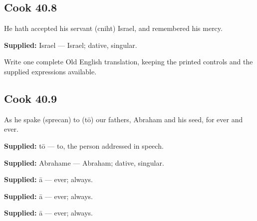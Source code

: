 \par\begin{minipage}{\linewidth}\raggedright
\subsection*{Cook 40.8}

He hath accepted his servant (cniht) Israel, and remembered his mercy.

\textbf{Supplied:} Israel — Israel; dative, singular.

Write one complete Old English translation, keeping the printed controls and the supplied expressions available.

\end{minipage}\par\addvspace{4pt}

\par\begin{minipage}{\linewidth}\raggedright
\subsection*{Cook 40.9}

As he spake (sprecan) to (tō) our fathers, Abraham and his seed, for ever and ever.

\textbf{Supplied:} tō — to, the person addressed in speech.

\end{minipage}\par\addvspace{4pt}

\textbf{Supplied:} Abrahame — Abraham; dative, singular.

\textbf{Supplied:} ā — ever; always.

\textbf{Supplied:} ā — ever; always.

\textbf{Supplied:} ā — ever; always.

